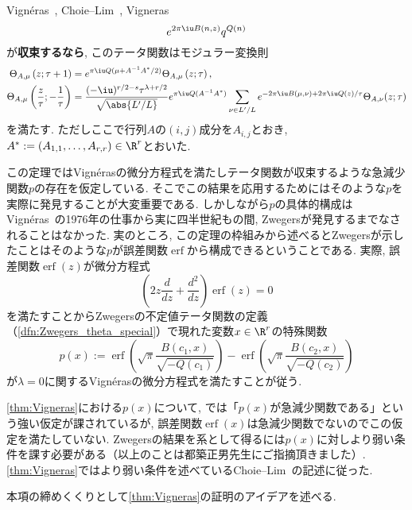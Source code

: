 \documentclass[11pt,b5paper,oneside,lualatex]{ltjsarticle} %
\DeclareMathOperator{\erf}{erf}
\numberwithin{equation}{section} %
\begin{document}
\begin{thm}{{Vign\'{e}ras~\cite{Vigneras}, Choie--Lim~\cite[Theorem 3.1]{Choie_Lim}, \cite[Theorem 8.27]{BFOR}}}{Vigneras}
\[	e^{2\pi\iu B(n, z)} q^{Q(n)}
	\]
	が\textbf{収束するなら}, このテータ関数はモジュラー変換則
	\begin{align}
		\Theta_{A, \mu} \left( z; \tau + 1 \right)
		&=
		e^{\pi\iu Q( \mu + A^{-1} A^* / 2)}
		\Theta_{A, \mu} \left( z; \tau \right),
		\\
		\Theta_{A, \mu} \left( \frac{z}{\tau}; -\frac{1}{\tau} \right)
		&=
		\frac{(-\iu)^{r/2 - s} \tau^{\lambda + r/2}}{\sqrt{\abs{L'/L}}}
		e^{\pi\iu Q(A^{-1} A^*)}
		\sum_{\nu \in L'/L} e^{-2\pi\iu B(\mu, \nu) + 2\pi\iu Q(z) / \tau } 
		\Theta_{A, \nu} (z; \tau)
	\end{align}
	を満たす. 
	ただしここで行列$ A $の$ (i, j) $成分を$ A_{i, j} $とおき, $ A^* := (A_{1, 1}, \dots, A_{r, r}) \in \R^r $とおいた. 
\end{thm}

この定理ではVign\'{e}rasの微分方程式を満たしテータ関数が収束するような急減少関数$ p $の存在を仮定している. 
そこでこの結果を応用するためにはそのような$ p $を実際に発見することが大変重要である.
しかしながら$ p $の具体的構成はVign\'{e}ras~\cite{Vigneras}の1976年の仕事から実に四半世紀もの間, Zwegersが発見するまでなされることはなかった.
実のところ, この定理の枠組みから述べるとZwegersが示したことはそのような$ p $が誤差関数$ \erf $から構成できるということである. 
実際, 誤差関数$ \erf(z) $が微分方程式
\[
\left( 2 z \frac{d}{dz} + \frac{d^2}{dz} \right) \erf(z) = 0
\]
を満たすことからZwegersの不定値テータ関数の定義（\cref{dfn:Zwegers_theta_special}）で現れた変数$ x \in \R^r $の特殊関数
\[
p(x) :=
\erf \left( \sqrt{\pi} \frac{B(c_1, x)}{\sqrt{-Q(c_1)}} \right) - \erf \left( \sqrt{\pi} \frac{B(c_2, x)}{\sqrt{-Q(c_2)}} \right)
\]
が$ \lambda = 0 $に関するVign\'{e}rasの微分方程式を満たすことが従う. 

\begin{rem}{}{}
	\cref{thm:Vigneras}における$ p(x) $について, \cite[Theorem 8.27]{BFOR}では「$ p(x) $が急減少関数である」という強い仮定が課されているが, 誤差関数$ \erf(x) $は急減少関数でないのでこの仮定を満たしていない.
	Zwegersの結果を系として得るには$ p(x) $に対しより弱い条件を課す必要がある（以上のことは都築正男先生にご指摘頂きました）.
	\cref{thm:Vigneras}ではより弱い条件を述べているChoie--Lim~\cite[Theorem 3.1]{Choie_Lim}の記述に従った.
\end{rem}

本項の締めくくりとして\cref{thm:Vigneras}の証明のアイデアを述べる. 
\end{document}
